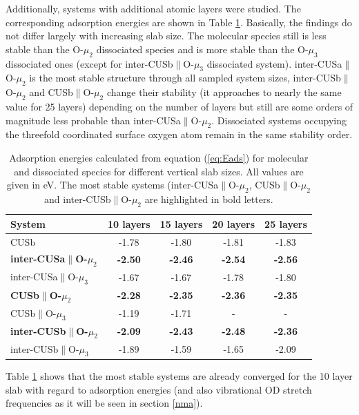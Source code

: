 \documentclass[11pt,DIV=13,BCOR=5mm,a4paper,headinclude]{scrbook}
\begin{document}
Additionally, systems with additional atomic layers were studied.
The corresponding adsorption energies are shown in Table \ref{tab:eads_layers}.
Basically, the findings do not differ largely with increasing slab size.
The molecular species still is less stable than the O-$\mu_2$ dissociated species and is more stable than the O-$\mu_3$ dissociated ones (except for inter-CUSb$\parallel$O-$\mu_3$ dissociated system).
inter-CUSa$\parallel$O-$\mu_2$ is the most stable structure through all sampled system sizes, inter-CUSb$\parallel$O-$\mu_2$ and CUSb$\parallel$O-$\mu_2$ change their stability (it approaches to nearly the same value for 25 layers) depending on the number of layers but still are some orders of magnitude less probable than inter-CUSa$\parallel$O-$\mu_2$.
Dissociated systems occupying the threefold coordinated surface oxygen atom remain in the same stability order.
\begin{table}[!ht]
  \centering
  \caption{Adsorption energies calculated from equation (\ref{eq:Eads}) for molecular and dissociated species for different vertical slab sizes.
All values are given in eV.
The most stable systems (inter-CUSa$\parallel$O-$\mu_2$, CUSb$\parallel$O-$\mu_2$ and inter-CUSb$\parallel$O-$\mu_2$ are highlighted in bold letters.}
 \begin{tabular}{l|cccc}
 \toprule
 System                     & 10 layers& 15 layers& 20 layers&  25 layers \\\midrule
CUSb                                    &-1.78 &-1.80     &-1.81     &-1.83      \\\hline
\textbf{inter-CUSa$\parallel$O-$\mu_2$}    &\textbf{-2.50} &\textbf{-2.46} &\textbf{-2.54} &\textbf{-2.56}  \\
inter-CUSa$\parallel$O-$\mu_3$          &-1.67 &-1.67 &-1.78 &-1.80 \\
\textbf{CUSb$\parallel$O-$\mu_2$}          &\textbf{-2.28} &\textbf{-2.35} &\textbf{-2.36} &\textbf{-2.35} \\
CUSb$\parallel$O-$\mu_3$                &-1.19 &-1.71 &-     &-      \\
\textbf{inter-CUSb$\parallel$O-$\mu_2$}    &\textbf{-2.09} &\textbf{-2.43} &\textbf{-2.48} &\textbf{-2.36}  \\
inter-CUSb$\parallel$O-$\mu_3$          &-1.89 &-1.59 &-1.65 &-2.09 \\\bottomrule
\end{tabular}
\label{tab:eads_layers}
\end{table}
Table \ref{tab:eads_layers} shows that the most stable systems are already converged for the 10 layer slab with regard to adsorption energies (and also vibrational OD stretch frequencies as it will be seen in section \ref{nma}).
\end{document}
